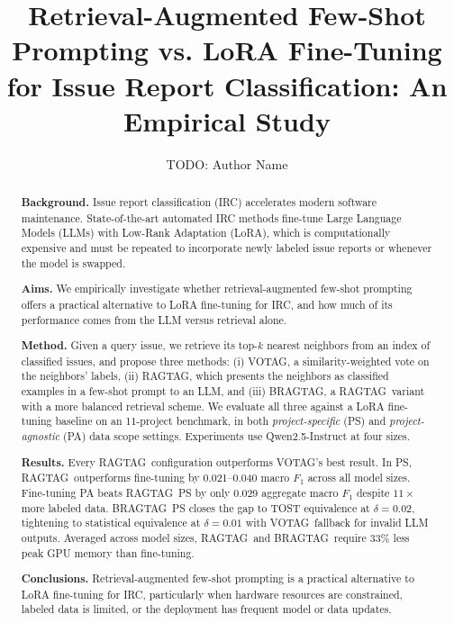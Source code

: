 \documentclass[a4paper,UKenglish,cleveref,autoref,thm-restate,anonymous]{lipics-v2021}
\title{Retrieval-Augmented Few-Shot Prompting vs. LoRA Fine-Tuning for Issue Report Classification: An Empirical Study}
\author{TODO: Author Name}{Affiliation, City, Country}{email@domain}{https://orcid.org/0000-0000-0000-0000}{}
\newcommand{\votag}{VOTAG\xspace}
\newcommand{\ragtag}{RAGTAG\xspace}
\newcommand{\bragtag}{BRAGTAG\xspace}
\begin{document}
\maketitle

\begin{abstract}
\textbf{Background.} Issue report classification (IRC) accelerates modern software maintenance. State-of-the-art automated IRC methods fine-tune Large Language Models (LLMs) with Low-Rank Adaptation (LoRA), which is computationally expensive and must be repeated to incorporate newly labeled issue reports or whenever the model is swapped.

\textbf{Aims.} We empirically investigate whether retrieval-augmented few-shot prompting offers a practical alternative to LoRA fine-tuning for IRC, and how much of its performance comes from the LLM versus retrieval alone.

\textbf{Method.} Given a query issue, we retrieve its top-$k$ nearest neighbors from an index of classified issues, and propose three methods: (i) \votag, a similarity-weighted vote on the neighbors' labels, (ii) \ragtag, which presents the neighbors as classified examples in a few-shot prompt to an LLM, and (iii) \bragtag, a \ragtag\ variant with a more balanced retrieval scheme. We evaluate all three against a LoRA fine-tuning baseline on an 11-project benchmark, in both \emph{project-specific} (PS) and \emph{project-agnostic} (PA) data scope settings. Experiments use Qwen2.5-Instruct at four sizes.

\textbf{Results.} Every \ragtag\ configuration outperforms \votag's best result. In PS, \ragtag\ outperforms fine-tuning by 0.021--0.040 macro $F_1$ across all model sizes. Fine-tuning PA beats \ragtag\ PS by only 0.029 aggregate macro $F_1$ despite $11\times$ more labeled data. \bragtag\ PS closes the gap to TOST equivalence at $\delta{=}0.02$, tightening to statistical equivalence at $\delta{=}0.01$ with \votag\ fallback for invalid LLM outputs. Averaged across model sizes, \ragtag\ and \bragtag\ require 33\% less peak GPU memory than fine-tuning.

\textbf{Conclusions.} Retrieval-augmented few-shot prompting is a practical alternative to LoRA fine-tuning for IRC, particularly when hardware resources are constrained, labeled data is limited, or the deployment has frequent model or data updates.
\end{abstract}












\end{document}
